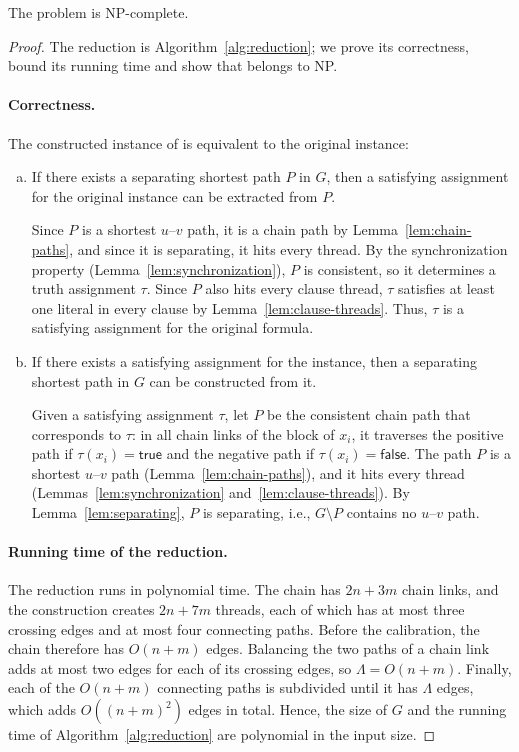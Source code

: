 \begin{theorem}
\label{thm:ssp-np-complete}
The \SSP{} problem is NP-complete.
\end{theorem}

\begin{proof}
The reduction is Algorithm~\ref{alg:reduction}; we prove its correctness, bound its running time and show that \SSP{} belongs to NP.

\paragraph{Correctness.}
The constructed instance of \SSP{} is equivalent to the original \ThreeSAT{} instance:
\begin{enumerate}[(a)]
    \item If there exists a separating shortest path $P$ in $G$, then a satisfying assignment for the original \ThreeSAT{} instance can be extracted from $P$.

    Since $P$ is a shortest $u$--$v$ path, it is a chain path by Lemma~\ref{lem:chain-paths}, and since it is separating, it hits every thread.
    By the synchronization property (Lemma~\ref{lem:synchronization}), $P$ is consistent, so it determines a truth assignment $\tau$.
    Since $P$ also hits every clause thread, $\tau$ satisfies at least one literal in every clause by Lemma~\ref{lem:clause-threads}.
    Thus, $\tau$ is a satisfying assignment for the original formula.

    \item If there exists a satisfying assignment for the \ThreeSAT{} instance, then a separating shortest path in $G$ can be constructed from it.

    Given a satisfying assignment $\tau$, let $P$ be the consistent chain path that corresponds to $\tau$: in all chain links of the block of $x_i$, it traverses the positive path if $\tau(x_i)=\mathsf{true}$ and the negative path if $\tau(x_i)=\mathsf{false}$.
    The path $P$ is a shortest $u$--$v$ path (Lemma~\ref{lem:chain-paths}), and it hits every thread (Lemmas~\ref{lem:synchronization} and~\ref{lem:clause-threads}).
    By Lemma~\ref{lem:separating}, $P$ is separating, i.e., $G\setminus P$ contains no $u$--$v$ path.
\end{enumerate}

\paragraph{Running time of the reduction.}
The reduction runs in polynomial time.
The chain has $2n+3m$ chain links, and the construction creates $2n+7m$ threads, each of which has at most three crossing edges and at most four connecting paths.
Before the calibration, the chain therefore has $O(n+m)$ edges.
Balancing the two paths of a chain link adds at most two edges for each of its crossing edges, so $\Lambda = O(n+m)$.
Finally, each of the $O(n+m)$ connecting paths is subdivided until it has $\Lambda$ edges, which adds $O((n+m)^2)$ edges in total.
Hence, the size of $G$ and the running time of Algorithm~\ref{alg:reduction} are polynomial in the input size.


\end{proof}
